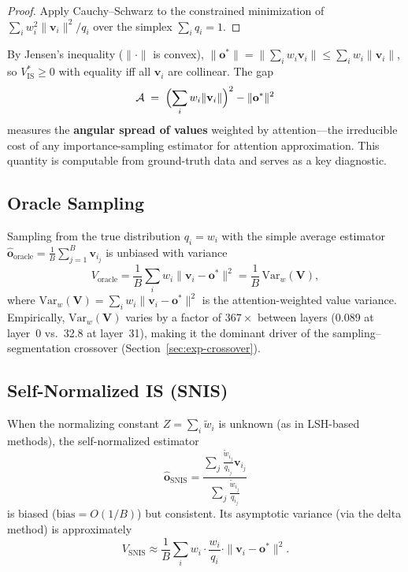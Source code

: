 \documentclass[11pt,a4paper]{article}
\theoremstyle{definition}
\newcommand{\vv}{\mathbf{v}}
\newcommand{\oo}{\mathbf{o}}
\newcommand{\Var}{\mathrm{Var}}
\begin{document}
\begin{proof}
Apply Cauchy--Schwarz to the constrained minimization of
$\sum_i w_i^2\|\vv_i\|^2/q_i$ over the simplex $\sum_i q_i=1$.
\end{proof}

By Jensen's inequality ($\|\cdot\|$ is convex),
$\|\oo^{*}\| = \|\sum_i w_i\vv_i\| \le \sum_i w_i\|\vv_i\|$,
so $V_{\mathrm{IS}}^{*}\ge 0$ with equality iff all $\vv_i$ are collinear.
The gap
\begin{equation}\label{eq:angular-spread}
  \mathcal{A} \;=\; \Bigl(\sum_i w_i\|\vv_i\|\Bigr)^{2} - \|\oo^{*}\|^{2}
\end{equation}
measures the \textbf{angular spread of values} weighted by attention---the
irreducible cost of any importance-sampling estimator for attention
approximation. This quantity is computable from ground-truth data and serves
as a key diagnostic.

\subsection{Oracle Sampling}

Sampling from the true distribution $q_i=w_i$ with the simple average
estimator
$\hat{\oo}_{\mathrm{oracle}}=\frac{1}{B}\sum_{j=1}^{B}\vv_{i_j}$
is unbiased with variance
\begin{equation}\label{eq:oracle-var}
  V_{\mathrm{oracle}}
  = \frac{1}{B}\sum_{i}w_i\|\vv_i - \oo^{*}\|^{2}
  = \frac{1}{B}\,\Var_w(\mathbf{V}),
\end{equation}
where $\Var_w(\mathbf{V})=\sum_i w_i\|\vv_i-\oo^*\|^2$ is the
attention-weighted value variance.
Empirically, $\Var_w(\mathbf{V})$ varies by a factor of $367\times$ between
layers (0.089 at layer~0 vs.\ 32.8 at layer~31), making it the dominant driver
of the sampling--segmentation crossover (Section~\ref{sec:exp-crossover}).

\subsection{Self-Normalized IS (SNIS)}

When the normalizing constant $Z=\sum_i\tilde{w}_i$ is unknown (as in
LSH-based methods), the self-normalized estimator
\begin{equation}
  \hat{\oo}_{\mathrm{SNIS}}
  = \frac{\sum_{j}\frac{\tilde{w}_{i_j}}{q_{i_j}}\vv_{i_j}}
         {\sum_{j}\frac{\tilde{w}_{i_j}}{q_{i_j}}}
\end{equation}
is biased ($\text{bias}=O(1/B)$) but consistent.  Its asymptotic variance
(via the delta method) is approximately
\begin{equation}\label{eq:snis-var}
  V_{\mathrm{SNIS}}
  \approx \frac{1}{B}\sum_{i}w_i\cdot\frac{w_i}{q_i}
    \cdot\|\vv_i - \oo^{*}\|^{2}.
\end{equation}
\end{document}
